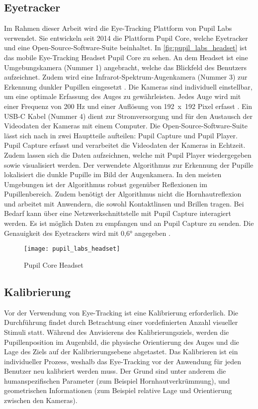 \subsection{Eyetracker}
Im Rahmen dieser Arbeit wird die Eye-Tracking Plattform von Pupil Labs verwendet. Sie entwickeln seit 2014 die Plattform Pupil Core, welche Eyetracker und eine Open-Source-Software-Suite beinhaltet. In \autoref{fig:pupil_labs_headset} ist das mobile Eye-Tracking Headset Pupil Core zu sehen. An dem Headset ist eine Umgebungskamera (Nummer 1) angebracht, welche das Blickfeld des Benutzers aufzeichnet. Zudem wird eine Infrarot-Spektrum-Augenkamera (Nummer 3) zur Erkennung dunkler Pupillen eingesetzt \cite{Kassner_2014}. Die Kameras sind individuell einstellbar, um eine optimale Erfassung des Auges zu gewährleisten. Jedes Auge wird mit einer Frequenz von 200 Hz und einer Auflösung von \mbox{192 x 192} Pixel erfasst \cite{PupilLabsSpec}. Ein USB-C Kabel (Nummer 4) dient zur Stromversorgung und für den Austausch der Videodaten der Kameras mit einem Computer. Die Open-Source-Software-Suite lässt sich nach \citeauthor{Kassner_2014} in zwei Hauptteile aufteilen: Pupil Capture und Pupil Player. Pupil Capture erfasst und verarbeitet die Videodaten der Kameras in Echtzeit. Zudem lassen sich die Daten aufzeichnen, welche mit Pupil Player wiedergegeben sowie visualisiert werden. Der verwendete Algorithmus zur Erkennung der Pupille lokalisiert die dunkle Pupille im Bild der Augenkamera. In den meisten Umgebungen ist der Algorithmus robust gegenüber Reflexionen im Pupillenbereich. Zudem benötigt der Algorithmus nicht die Hornhautreflexion und arbeitet mit Anwendern, die sowohl Kontaktlinsen und Brillen tragen. \cite{Kassner_2014} Bei Bedarf kann über eine Netzwerkschnittstelle mit Pupil Capture interagiert werden. Es ist möglich Daten zu empfangen und an Pupil Capture zu senden. \cite{PupilLabsNet} Die Genauigkeit des Eyetrackers wird mit 0,6° angegeben \cite{PupilLabsSpec}.

\begin{figure}[!htbp]
	\centering
	\texttt{[image: pupil\_labs\_headset]}
	\caption[Pupil Core Headset]{Pupil Core Headset \cite{PupilLabsHW}}
	\label{fig:pupil_labs_headset}
\end{figure}

\subsection{Kalibrierung}
Vor der Verwendung von Eye-Tracking ist eine Kalibrierung erforderlich. Die Durchführung findet durch Betrachtung einer vordefinierten Anzahl visueller Stimuli statt. Während des Anvisierens des Kalibrierungsziels, werden die Pupillenposition im Augenbild, die physische Orientierung des Auges und die Lage des Ziels auf der Kalibrierungsebene abgetastet. Das Kalibrieren ist ein individueller Prozess, weshalb das Eye-Tracking vor der Anwendung für jeden Benutzer neu kalibriert werden muss. Der Grund sind unter anderem die humanspezifischen Parameter (zum Beispiel Hornhautverkrümmung), und geometrischen Informationen (zum Beispiel relative Lage und Orientierung zwischen den Kameras). \cite{Lander.2018}

